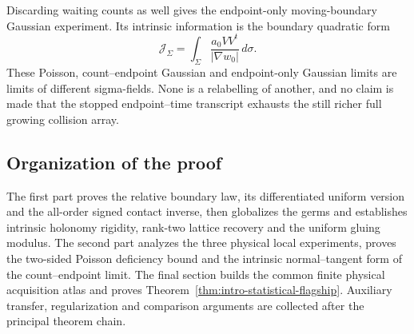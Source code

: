 Discarding waiting counts as well gives the endpoint-only moving-boundary
Gaussian experiment.  Its intrinsic information is the boundary quadratic
form
\[
 \mathcal J_\Sigma=
 \int_\Sigma\frac{a_0VV^t}{|\nabla w_0|}\,d\sigma.
\]
These Poisson, count--endpoint Gaussian and endpoint-only Gaussian limits are
limits of different sigma-fields.  None is a relabelling of another, and no
claim is made that the stopped endpoint--time transcript exhausts the still
richer full growing collision array.

\subsection{Organization of the proof}

The first part proves the relative boundary law, its differentiated uniform
version and the all-order signed contact inverse, then globalizes the germs and
establishes intrinsic holonomy rigidity, rank-two lattice recovery and the
uniform gluing modulus.  The second part analyzes the three physical local
experiments, proves the two-sided Poisson deficiency bound and the intrinsic
normal--tangent form of the count--endpoint limit.  The final section builds
the common finite physical acquisition atlas and proves
Theorem~\ref{thm:intro-statistical-flagship}.  Auxiliary transfer,
regularization and comparison arguments are collected after the principal
theorem chain.
